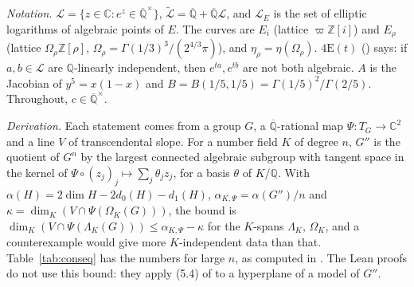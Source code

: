 \documentclass[11pt]{amsart}
\theoremstyle{definition}
\theoremstyle{remark}
\numberwithin{equation}{section}
\newcommand{\ZZ}{\mathbb{Z}}
\newcommand{\QQ}{\mathbb{Q}}
\newcommand{\CC}{\mathbb{C}}
\newcommand{\Qbar}{\overline{\mathbb{Q}}}
\newcommand{\vp}{\varpi}
\begin{document}
\emph{Notation.} $\mathcal L=\{z\in\CC:e^z\in\Qbar^\times\}$, $\widetilde{\mathcal L}=\Qbar+\Qbar\mathcal L$, and
$\mathcal L_E$ is the set of elliptic logarithms of algebraic points of $E$. The curves are $E_i$ (lattice $\vp\ZZ[i]$) and
$E_\rho$ (lattice $\Omega_\rho\ZZ[\rho]$, $\Omega_\rho=\Gamma(1/3)^3/(2^{4/3}\pi)$), and $\eta_\rho=\eta(\Omega_\rho)$.
$\mathrm{4E}(t)$ () says: if $a,b\in\mathcal L$ are $\QQ$-linearly independent, then $e^{ta},e^{tb}$ are not
both algebraic. $A$ is the Jacobian of $y^5=x(1-x)$ and $B=B(1/5,1/5)=\Gamma(1/5)^2/\Gamma(2/5)$. Throughout, $c\in\Qbar^\times$.

\emph{Derivation.} Each statement comes from a group $G$, a $\Qbar$-rational map $\Psi\colon T_G\to\CC^2$ and a line $V$ of
transcendental slope. For a number field $K$ of degree $n$, $G''$ is the quotient of $G^n$ by the largest connected algebraic
subgroup with tangent space in the kernel of $\Psi\circ(z_j)_j\mapsto\sum_j\theta_jz_j$, for a basis $\theta$ of $K/\QQ$. With
$\alpha(H)=2\dim H-2d_0(H)-d_1(H)$, $\alpha_{K,\Psi}=\alpha(G'')/n$ and $\kappa=\dim_K(V\cap\Psi(\Omega_K(G)))$, the bound is
$\dim_K(V\cap\Psi(\Lambda_K(G)))\le\alpha_{K,\Psi}-\kappa$ for the $K$-spans $\Lambda_K$, $\Omega_K$, and a counterexample
would give more $K$-independent data than that. Table~\ref{tab:conseq} has the numbers for large $n$, as computed in
\cite{Note,MstarPaper}. The Lean proofs do not use this bound: they apply (5.4) of \cite[\S5d]{W88} to a hyperplane of a model of
$G''$.
\end{document}
